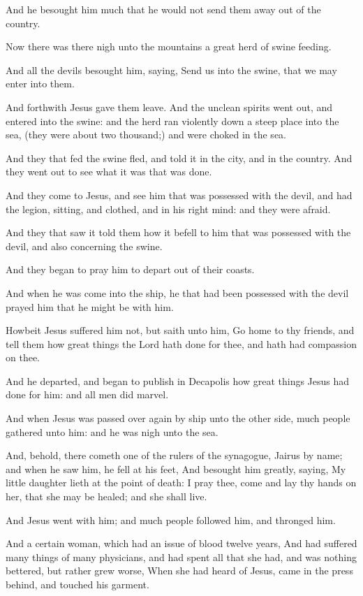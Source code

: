 \verse And he besought him much that he would not send them away out of the country.

\verse Now there was there nigh unto the mountains a great herd of swine feeding.

\verse And all the devils besought him, saying, Send us into the swine, that we may enter into them.

\verse And forthwith Jesus gave them leave. And the unclean spirits went out, and entered into the swine: and the herd ran violently down a steep place into the sea, (they were about two thousand;) and were choked in the sea.

\verse And they that fed the swine fled, and told it in the city, and in the country. And they went out to see what it was that was done.

\verse And they come to Jesus, and see him that was possessed with the devil, and had the legion, sitting, and clothed, and in his right mind: and they were afraid.

\verse And they that saw it told them how it befell to him that was possessed with the devil, and also concerning the swine.

\verse And they began to pray him to depart out of their coasts.

\verse And when he was come into the ship, he that had been possessed with the devil prayed him that he might be with him.

\verse Howbeit Jesus suffered him not, but saith unto him, Go home to thy friends, and tell them how great things the Lord hath done for thee, and hath had compassion on thee.

\verse And he departed, and began to publish in Decapolis how great things Jesus had done for him: and all men did marvel.

\verse And when Jesus was passed over again by ship unto the other side, much people gathered unto him: and he was nigh unto the sea.

\verse And, behold, there cometh one of the rulers of the synagogue, Jairus by name; and when he saw him, he fell at his feet, \verse And besought him greatly, saying, My little daughter lieth at the point of death: I pray thee, come and lay thy hands on her, that she may be healed; and she shall live.

\verse And Jesus went with him; and much people followed him, and thronged him.

\verse And a certain woman, which had an issue of blood twelve years, \verse And had suffered many things of many physicians, and had spent all that she had, and was nothing bettered, but rather grew worse, \verse When she had heard of Jesus, came in the press behind, and touched his garment.

